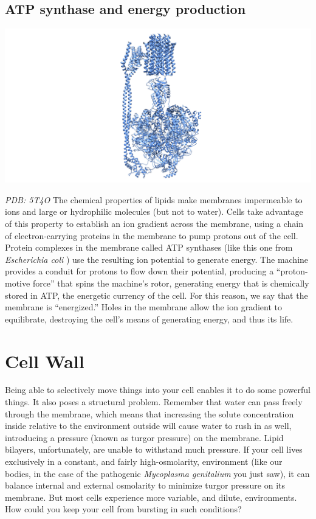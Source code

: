 \documentclass[]{tufte-book}
\begin{document}
\hypertarget{ATP_synthase_and_energy_production}{%
\subsection{ATP synthase and energy production}\label{ATP_synthase_and_energy_production}}

\includegraphics{img/schematics/2_1_2}

\emph{PDB: 5T4O}
The chemical properties of lipids make membranes impermeable to ions and large or hydrophilic molecules (but not to water). Cells take advantage of this property to establish an ion gradient across the membrane, using a chain of electron-carrying proteins in the membrane to pump protons out of the cell. Protein complexes in the membrane called ATP synthases (like this one from \emph{Escherichia coli} \citep{sobti2016}) use the resulting ion potential to generate energy. The machine provides a conduit for protons to flow down their potential, producing a ``proton-motive force'' that spins the machine's rotor, generating energy that is chemically stored in ATP, the energetic currency of the cell. For this reason, we say that the membrane is ``energized.'' Holes in the membrane allow the ion gradient to equilibrate, destroying the cell's means of generating energy, and thus its life.

\hypertarget{cell-wall}{%
\section{Cell Wall}\label{cell-wall}}

Being able to selectively move things into your cell enables it to do some powerful things. It also poses a structural problem. Remember that water can pass freely through the membrane, which means that increasing the solute concentration inside relative to the environment outside will cause water to rush in as well, introducing a pressure (known as turgor pressure) on the membrane. Lipid bilayers, unfortunately, are unable to withstand much pressure. If your cell lives exclusively in a constant, and fairly high-osmolarity, environment (like our bodies, in the case of the pathogenic \emph{Mycoplasma genitalium} you just saw), it can balance internal and external osmolarity to minimize turgor pressure on its membrane. But most cells experience more variable, and dilute, environments. How could you keep your cell from bursting in such conditions?
\end{document}
